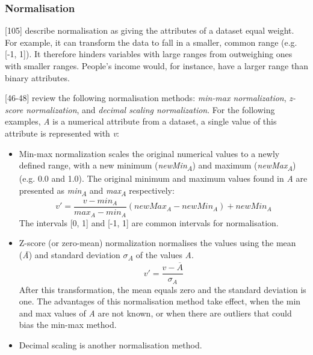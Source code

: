 \subsubsection{Normalisation}
\label{section:Normalisation}

\textcite{han2011data}[105] describe normalisation as giving the attributes of a dataset equal weight. For example, it can transform the data to fall in a smaller, common range (e.g. [-1, 1]). It therefore hinders variables with large ranges from outweighing ones with smaller ranges. People's income would, for instance, have a larger range than binary attributes. 

\textcite{dataPreprocessingInDataMining}[46-48] review the following normalisation methods: \textit{min-max normalization}, \textit{z-score normalization}, and \textit{decimal scaling normalization}. For the following examples, \textit{A} is a numerical attribute from a dataset, a single value of this attribute is represented with \textit{v}:
\begin{itemize}
  \item Min-max normalization scales the original numerical values to a newly defined range, with a new minimum (\textit{newMin\textsubscript{A}}) and maximum (\textit{newMax\textsubscript{A}}) (e.g. 0.0 and 1.0). The original minimum and maximum values found in \textit{A} are presented as \textit{min\textsubscript{A}} and \textit{max\textsubscript{A}} respectively:
  \[
    v' = \frac{v - min_A}{max_A - min_A}(newMax_A - newMin_A) + newMin_A
  \]
  The intervals [0, 1] and [-1, 1] are common intervals for normalisation. 

  \item Z-score (or zero-mean) normalization normalises the values using the mean (\textit{\={A}}) and standard deviation \textit{$\sigma$\textsubscript{A}} of the values \textit{A}.
  \[
    v' = \frac{v - \overline{A}}{\sigma_A}
  \]
  After this transformation, the mean equals zero and the standard deviation is one. The advantages of this normalisation method take effect, when the min and max values of \textit{A} are not known, or when there are outliers that could bias the min-max method.

  \item Decimal scaling is another normalisation method.
\end{itemize}
